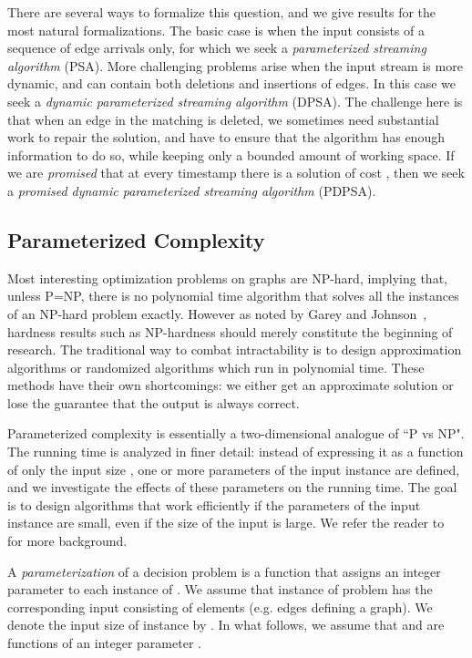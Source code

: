 \documentclass[11pt,letter]{article}
\begin{document}
There are several ways to formalize this question, and we give results for the most natural formalizations.
The basic case is when the input consists of a sequence of edge
arrivals only, for which we seek a {\em parameterized streaming
  algorithm} (PSA).
More challenging problems arise when the input stream is more
dynamic, and can contain both deletions and insertions of edges. In this case we seek a {\em dynamic parameterized streaming
  algorithm} (DPSA).
The challenge here is that when an edge in the matching is deleted, we
sometimes need substantial work to repair the solution, and have to
ensure that the algorithm has enough information to do so, while keeping only a bounded amount of working space. If we are \emph{promised} that at every timestamp there is a solution of cost , then we seek a {\em promised dynamic parameterized streaming
  algorithm} (PDPSA).









\subsection{Parameterized Complexity}

Most interesting optimization problems on graphs are NP-hard,
implying that, unless P=NP, there is no polynomial time algorithm
that solves all the instances of an NP-hard problem exactly.
However as noted by Garey and Johnson~\cite{garey-johnson},
hardness results such as NP-hardness should merely constitute
the beginning of research.
The traditional way to combat  intractability is to design approximation
algorithms or randomized algorithms which run in polynomial time.
These methods have their own shortcomings:
we either get an approximate solution or lose the guarantee that
the output is always correct.


Parameterized complexity is essentially a two-dimensional analogue of ``P
vs NP". The running time is analyzed in finer detail:
instead of expressing it as a function of only the input size , one
or more parameters of the input instance are defined,
and we investigate the effects of these parameters on the running time.
The goal is to design algorithms that work efficiently if
the parameters of the input instance are small, even if the size of
the input is large. We refer the reader to~\cite{DF99, FG06} for more background.

A  \textit{parameterization} of a decision problem   is a function
that assigns an integer parameter  to each instance  of .
We assume that instance  of problem  has
the corresponding input 
consisting of elements  (e.g. edges defining a graph).
We denote the input size of instance   by .
In what follows, we assume that  and  are functions of an
integer parameter .
\end{document}
